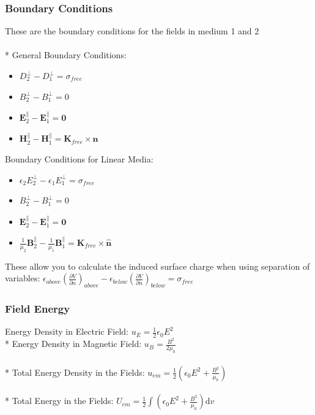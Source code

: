 \subsubsection{Boundary Conditions}
These are the boundary conditions for the fields in medium 1 and 2\\\\*
General Boundary Conditions:
\begin{itemize}
\item \(D_{2}^{\bot}-D_{1}^{\bot}=\sigma_{free}\)
\item \(B_{2}^{\bot}-B_{1}^{\bot}=0\)
\item \(\mathbf{E}_{2}^{\parallel}-\mathbf{E}_{1}^{\parallel}=\mathbf{0}\)
\item \(\mathbf{H}_{2}^{\parallel}-\mathbf{H}_{1}^{\parallel}=\mathbf{K}_{free}\times\hat{\mathbf{n}}\)
\end{itemize}
Boundary Conditions for Linear Media:
\begin{itemize}
\item \(\epsilon_2E_{2}^{\bot}-\epsilon_1E_{1}^{\bot}=\sigma_{free}\)
\item \(B_{2}^{\bot}-B_{1}^{\bot}=0\)
\item \(\mathbf{E}_{2}^{\parallel}-\mathbf{E}_{1}^{\parallel}=\mathbf{0}\)
\item \(\displaystyle\frac{1}{\mu_2}\mathbf{B}_{2}^{\parallel}-\frac{1}{\mu_1}\mathbf{B}_{1}^{\parallel}=\mathbf{K}_{free}\times\hat{\mathbf{n}}\)
\end{itemize}

These allow you to calculate the induced surface charge when using separation of variables: \(\displaystyle \epsilon_{above}\left(\frac{\partial V}{\partial n}\right)_{above}-\epsilon_{below}\left(\frac{\partial V}{\partial n}\right)_{below}=\sigma_{free}\)

\subsubsection{Field Energy}
Energy Density in Electric Field: \(\displaystyle u_E=\frac{1}{2}\epsilon_0E^2\)\\*
Energy Density in Magnetic Field: \(\displaystyle u_B=\frac{B^2}{2\mu_0}\)\\\\*
Total Energy Density in the Fields: \(\displaystyle u_{em}=\frac{1}{2}\left(\epsilon_0E^2+\frac{B^2}{\mu_0}\right)\)\\\\*
Total Energy  in the Fields: \(\displaystyle U_{em}=\frac{1}{2}\int\left(\epsilon_0E^2+\frac{B^2}{\mu_0}\right)\mathrm{d}v\)

